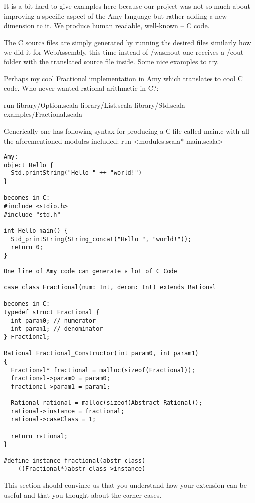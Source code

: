 
It is a bit hard to give examples here because our project was not so much about improving a specific aspect of the Amy language but rather adding a new dimension to it. We produce human readable, well-known -- C code.

The C source files are simply generated by running the desired files similarly how we did it for WebAssembly. this time instead of /wasmout one receives a /cout folder with the translated source file inside. Some nice examples to try.

Perhaps my cool Fractional implementation in Amy which translates to cool C code. Who never wanted rational arithmetic in C?:

run library/Option.scala library/List.scala library/Std.scala examples/Fractional.scala

Generically one has following syntax for producing a C file called main.c with all the aforementioned modules included:
run \textless modules.scala* main.scala\textgreater\space

%

\begin{lstlisting}
Amy:
object Hello {
  Std.printString("Hello " ++ "world!")
}

becomes in C:
#include <stdio.h>
#include "std.h"

int Hello_main() {
  Std_printString(String_concat("Hello ", "world!"));
  return 0;
}
\end{lstlisting}

\begin{lstlisting}
One line of Amy code can generate a lot of C Code

case class Fractional(num: Int, denom: Int) extends Rational

becomes in C:
typedef struct Fractional {
  int param0; // numerator
  int param1; // denominator
} Fractional;

Rational Fractional_Constructor(int param0, int param1) 
{
  Fractional* fractional = malloc(sizeof(Fractional));
  fractional->param0 = param0;
  fractional->param1 = param1;

  Rational rational = malloc(sizeof(Abstract_Rational));
  rational->instance = fractional;
  rational->caseClass = 1;

  return rational;
}

#define instance_fractional(abstr_class)
	((Fractional*)abstr_class->instance)

\end{lstlisting}
This section should convince us that you understand how your extension can be
useful and that you thought about the corner cases.
